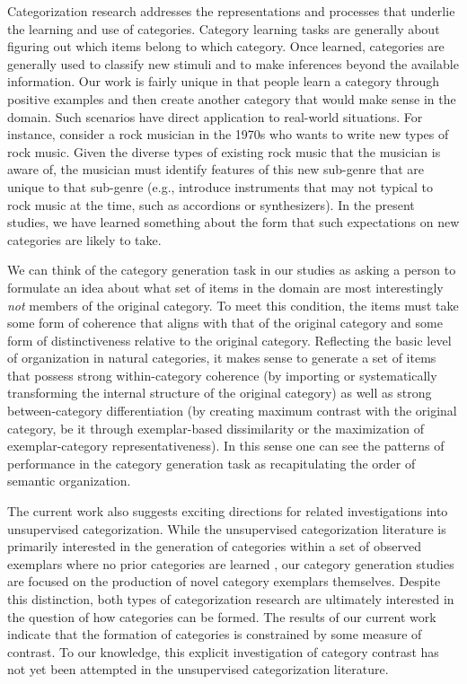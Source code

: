 \documentclass[pdflatex,sn-apa]{sn-jnl}%
\theoremstyle{thmstyleone}%
\theoremstyle{thmstyletwo}%
\theoremstyle{thmstylethree}%
\begin{document}
Categorization research addresses the representations and processes that
underlie the learning and use of categories. Category learning tasks are
generally about figuring out which items belong to which category. Once learned,
categories are generally used to classify new stimuli and to make inferences
beyond the available information. Our work is fairly unique in that people learn
a category through positive examples and then create another category that would
make sense in the domain. Such scenarios have direct application to real-world
situations. For instance, consider a rock musician in the 1970s who wants to
write new types of rock music. Given the diverse types of existing rock music that the
musician is aware of, the musician must identify features of this new sub-genre
that are unique to that sub-genre (e.g., introduce instruments that may not
typical to rock music at the time, such as accordions or synthesizers). In the
present studies, we have learned something about the form that such expectations
on new categories are likely to take.

We can think of the category generation task in our studies as asking a person
to formulate an idea about what set of items in the domain are most
interestingly {\em not} members of the original category. To meet this
condition, the items must take some form of coherence that aligns with that of
the original category and some form of distinctiveness relative to the original
category. Reflecting the basic level of organization in natural categories, it
makes sense to generate a set of items that possess strong within-category
coherence (by importing or systematically transforming the internal structure of
the original category) as well as strong between-category differentiation (by
creating maximum contrast with the original category, be it through
exemplar-based dissimilarity or the maximization of exemplar-category
representativeness). In this sense one can see the patterns of performance in
the category generation task as recapitulating the order of semantic
organization.

The current work also suggests exciting directions for related investigations
into unsupervised categorization. While the unsupervised categorization
literature is primarily interested in the generation of categories within a set
of observed exemplars where no prior categories are learned
\citep[e.g.,][]{pothos2011measuring}, our category generation studies are
focused on the production of novel category exemplars themselves. Despite this
distinction, both types of categorization research are ultimately interested in
the question of how categories can be formed. The results of our current work
indicate that the formation of categories is constrained by some measure of
contrast. To our knowledge, this explicit investigation of category contrast has
not yet been attempted in the unsupervised categorization literature.
\end{document}

